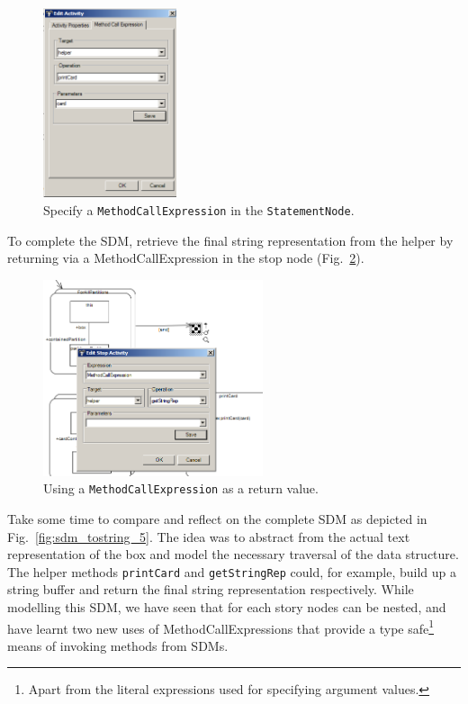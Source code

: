 \begin{figure}[htbp]
\begin{center}
  \includegraphics[width=0.35\textwidth]{pics/sdmBilder/toString/sdm74}
  \caption{Specify a \texttt{MethodCallExpression} in the
  \texttt{StatementNode}.}
  \label{fig:sdm_tostring_3}
\end{center}
\end{figure}

To complete the SDM, retrieve the final string representation from the helper by
returning via a MethodCallExpression in the stop node
(Fig.~\ref{fig:sdm_tostring_4}). 

\begin{figure}[htbp]
\begin{center}
  \includegraphics[width=0.576\textwidth]{pics/sdmBilder/toString/sdm75}
  \caption{Using a \texttt{MethodCallExpression} as a return value.}  
  \label{fig:sdm_tostring_4}
\end{center}
\end{figure}

Take some time to compare and reflect on the complete SDM as depicted in
Fig.~\ref{fig:sdm_tostring_5}.  The idea was to abstract from the actual text
representation of the box and model the necessary traversal of the data
structure.  The helper methods \texttt{printCard} and
\texttt{getStringRep} could, for example, build up a string buffer and return
the final string representation respectively.  While modelling this SDM, we have
seen that for each story nodes can be nested, and have learnt two new uses of
MethodCallExpressions that provide a type safe\footnote{Apart from the literal
expressions used for specifying argument values.} means of invoking methods from
SDMs.

